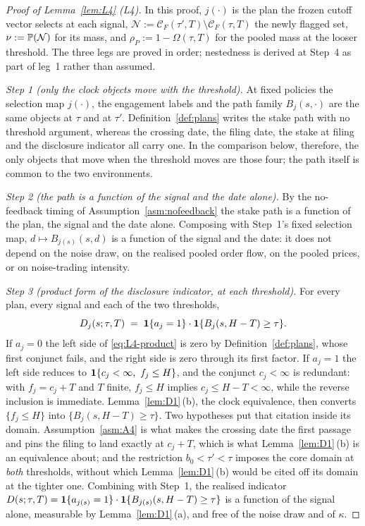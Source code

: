 \begin{proof}[Proof of Lemma~\ref{lem:L4} (L4)]
In this proof, $j(\cdot)$ is the plan the frozen cutoff vector selects at each signal,
$\mathcal N := \mathcal C_F(\tau',T)\setminus\mathcal C_F(\tau,T)$ the newly flagged set,
$\nu := \mathbb{P}(\mathcal N)$ for its mass, and $\rho_P := 1-\Omega(\tau,T)$ for the pooled mass at the
looser threshold. The three legs are proved in order; nestedness is derived at Step~4 as part of
leg~1 rather than assumed.

\emph{Step 1 (only the clock objects move with the threshold).} At fixed policies the selection map
$j(\cdot)$, the engagement labels and the path family $B_j(s,\cdot)$ are the same objects at $\tau$
and at $\tau'$. Definition~\ref{def:plans} writes the stake path with no threshold argument, whereas
the crossing date, the filing date, the stake at filing and the disclosure indicator all carry one.
In the comparison below, therefore, the only objects that move when the threshold moves are those
four; the path itself is common to the two environments.

\emph{Step 2 (the path is a function of the signal and the date alone).} By the no-feedback timing of
Assumption~\ref{asm:nofeedback} the stake path is a function of the plan, the signal and the date
alone. Composing with Step~1's fixed selection map, $d \mapsto B_{j(s)}(s,d)$ is a function of the
signal and the date: it does not depend on the noise draw, on the realised pooled order flow, on the
pooled prices, or on noise-trading intensity.

\emph{Step 3 (product form of the disclosure indicator, at each threshold).} For every plan, every
signal and each of the two thresholds,
\begin{equation}
\label{eq:L4-product}
D_j(s;\tau,T) \;=\; \mathbf{1}\{a_j = 1\}\cdot\mathbf{1}\{B_j(s,H-T) \ge \tau\}.
\end{equation}
If $a_j = 0$ the left side of \eqref{eq:L4-product} is zero by Definition~\ref{def:plans}, whose
first conjunct fails, and the right side is zero through its first factor. If $a_j = 1$ the left side
reduces to $\mathbf{1}\{c_j<\infty,\ f_j \le H\}$, and the conjunct $c_j < \infty$ is redundant: with
$f_j = c_j+T$ and $T$ finite, $f_j \le H$ implies $c_j \le H-T < \infty$, while the reverse inclusion
is immediate. Lemma~\ref{lem:D1}\,(b), the clock equivalence, then converts $\{f_j \le H\}$ into
$\{B_j(s,H-T) \ge \tau\}$. Two hypotheses put that citation inside its domain.
Assumption~\ref{asm:A4} is what makes the crossing date the first passage and pins the filing to land
exactly at $c_j+T$, which is what Lemma~\ref{lem:D1}\,(b) is an equivalence about; and the
restriction $b_0 < \tau' < \tau$ imposes the core domain at \emph{both} thresholds, without which
Lemma~\ref{lem:D1}\,(b) would be cited off its domain at the tighter one. Combining with Step~1, the
realised indicator $D(s;\tau,T) = \mathbf{1}\{a_{j(s)}=1\}\cdot\mathbf{1}\{B_{j(s)}(s,H-T)\ge\tau\}$ is a
function of the signal alone, measurable by Lemma~\ref{lem:D1}\,(a), and free of the noise draw and
of $\kappa$.


\end{proof}
